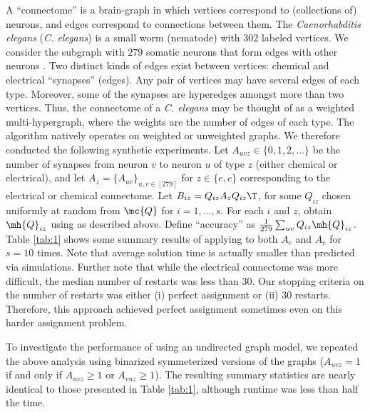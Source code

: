 \documentclass[10pt,journal,cspaper,compsoc]{IEEEtran}
\begin{document}
A ``connectome'' is a brain-graph in which vertices correspond to (collections of) neurons, and edges correspond to connections between them. The \emph{Caenorhabditis elegans} (\emph{C. elegans}) is a small worm (nematode) with $302$ labeled vertices.  We consider the subgraph with $279$ somatic neurons that form edges with other neurons \cite{WhiteBrenner86, Varshney2011}.  Two distinct kinds of edges exist between vertices: chemical and electrical ``synapses'' (edges). Any pair of vertices may have several edges of each type. Moreover, some of the synapses are hyperedges amongst more than two vertices.    Thus, the connectome of a \emph{C. elegans} may be thought of as a weighted multi-hypergraph, where the weights are the number of edges of each type.  The \rqapm algorithm natively operates on weighted or unweighted graphs.  We therefore conducted the following synthetic experiments.  Let $A_{uvz} \in \{0,1,2,\ldots\}$ be the number of synapses from neuron $v$ to neuron $u$ of type $z$ (either chemical or electrical), and let $A_z=\{A_{uv}\}_{u,v \in [279]}$ for $z \in \{e,c\}$ corresponding to the electrical or chemical connectome.  Let $B_{iz}=Q_{iz} A_z Q_{iz}\T$, for some $Q_{iz}$ chosen uniformly at random from $\mc{Q}$ for $i=1,\ldots,s$.  For each $i$ and $z$, obtain $\mh{Q}_{iz}$ using \rqapm as described above.  Define ``accuracy'' as $\frac{1}{279}\sum_{uv} Q_{iz} \mh{Q}_{iz}$.  Table \ref{tab:1} shows some summary results of applying \rqapm to both $A_c$ and $A_e$ for $s=10$ times.  Note that average solution time is actually smaller than predicted via simulations.  Further note that while the electrical connectome was more difficult, the median number of restarts was less than $30$.  Our stopping criteria on the number of restarts was either (i) perfect assignment or (ii) 30 restarts.  Therefore, this approach achieved perfect assignment sometimes even on this harder assignment problem.

To investigate the performance of \rqap using an undirected graph model, we repeated the above analysis using binarized symmeterized versions of the graphs ($A_{uvz}=1$ if and only if $A_{uvz}\geq 1$ or $A_{vuz} \geq 1$).  The resulting summary statistics are nearly identical to those presented in Table \ref{tab:1}, although runtime was less than half the time.
\end{document}
